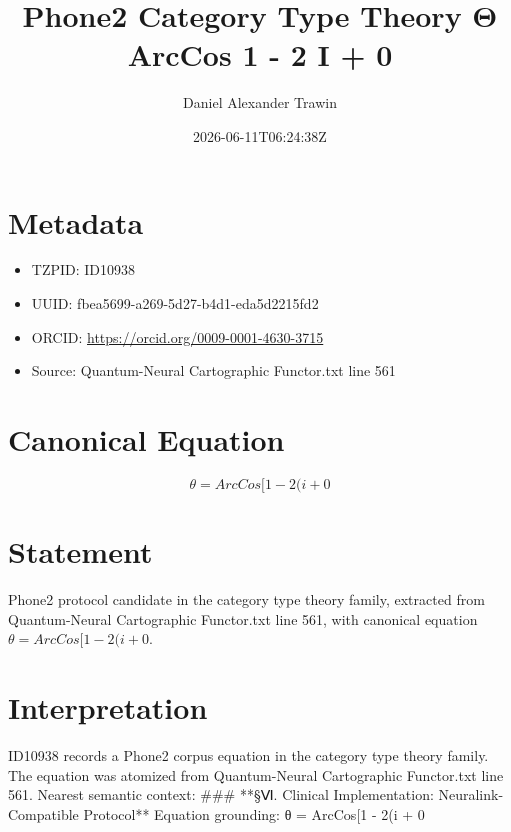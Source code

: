 \documentclass[11pt]{article}
\title{Phone2 Category Type Theory Θ ArcCos 1 - 2 I + 0}
\author{Daniel Alexander Trawin}
\date{2026-06-11T06:24:38Z}
\begin{document}
\maketitle
\section*{Metadata}
\begin{itemize}
\item TZPID: ID10938
\item UUID: fbea5699-a269-5d27-b4d1-eda5d2215fd2
\item ORCID: \url{https://orcid.org/0009-0001-4630-3715}
\item Source: Quantum-Neural Cartographic Functor.txt line 561
\end{itemize}
\section*{Canonical Equation}
\[
θ = ArcCos[1 - 2(i + 0
\]
\section*{Statement}
Phone2 protocol candidate in the category type theory family, extracted from Quantum-Neural Cartographic Functor.txt line 561, with canonical equation $θ = ArcCos[1 - 2(i + 0$.
\section*{Interpretation}
ID10938 records a Phone2 corpus equation in the category type theory family. The equation was atomized from Quantum-Neural Cartographic Functor.txt line 561. Nearest semantic context: ### **§Ⅵ. Clinical Implementation: Neuralink-Compatible Protocol** Equation grounding: θ = ArcCos[1 - 2(i + 0
\end{document}
